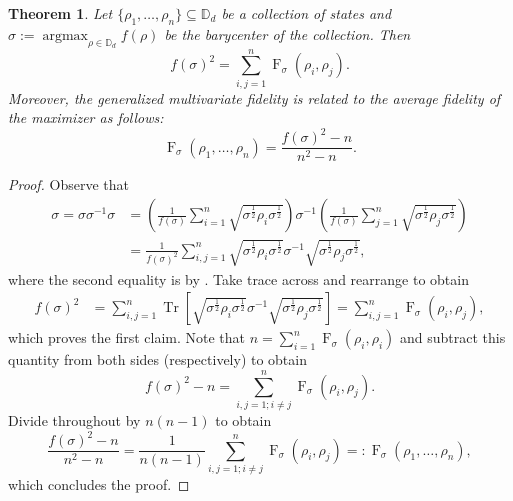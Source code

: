 \documentclass[12pt]{article}
\newtheorem{theorem}{Theorem}[section] %
\theoremstyle{definition}
\newcommand{\Fg}[3]{\operatorname{F}_{#3}\!\left(#1, #2\right)}
\DeclareMathOperator*{\argmax}{argmax}
\begin{document}
\begin{theorembox}
    \begin{theorem}
        Let $\{\rho_1, \dots, \rho_n\}  \subseteq \mathbb D_d$ be a collection of states and $\sigma := \argmax_{\rho \in \mathbb D_d} f(\rho)$ be the barycenter of the collection. Then
        \begin{equation}
            f(\sigma)^2 = \sum_{i,j=1}^{n} \Fg{\rho_i}{\rho_j}{\sigma}. 
        \end{equation}
        Moreover, the generalized multivariate fidelity is related to the average fidelity of the maximizer as follows:
        \begin{equation}
            \operatorname{F}_\sigma (\rho_1, \dots, \rho_n) = \frac{f(\sigma)^2-n}{n^2 - n}.
        \end{equation}
    \end{theorem}
\end{theorembox}
\begin{proof}
Observe that
\begin{equation}
    \begin{aligned}
              \sigma = \sigma \sigma ^{-1} \sigma  &= \left(\frac{1}{f(\sigma)} \sum_{i=1}^{n} \sqrt{\sigma ^{\frac12} \rho_i \sigma^{\frac12} }\right) \sigma^{-1} \left(\frac{1}{f(\sigma)} \sum_{j=1}^{n} \sqrt{\sigma ^{\frac12} \rho_j \sigma^{\frac12} } \right) \\
        &= \frac{1}{f(\sigma)^2} \sum_{i,j=1}^n \sqrt{\sigma ^{\frac12} \rho_i \sigma ^{\frac12}}  \sigma ^{-1} \sqrt{\sigma ^{\frac12} \rho_j \sigma ^{\frac12}},
    \end{aligned}
\end{equation}
where the second equality is by . Take trace across and rearrange to obtain
\begin{equation}
    \begin{aligned}
            f(\sigma)^2 &= \sum_{i,j=1}^{n} \operatorname{Tr}\left[ \sqrt{\sigma ^{\frac12} \rho_i \sigma ^{\frac12}}  \sigma ^{-1} \sqrt{\sigma ^{\frac12} \rho_j \sigma ^{\frac12}}\right] = \sum_{i,j=1}^{n} \Fg{\rho_i}{\rho_j}{\sigma}, 
    \end{aligned}
     \end{equation}
which proves the first claim. Note that $n = \sum_{i=1}^{n} \Fg{\rho_i}{\rho_i}{\sigma}$ and subtract this quantity from both sides (respectively) to obtain   
\begin{equation}
     f(\sigma)^2 - n = \sum_{i,j=1; i \neq j}^{n} \Fg{\rho_i}{\rho_j}{\sigma}. 
\end{equation}
Divide throughout by $n(n-1)$ to obtain
\begin{equation} 
    \frac{f(\sigma)^2 - n}{n^2 - n} = \frac1{n (n-1)} \sum_{i,j=1; i \neq j}^{n} \Fg{\rho_i}{\rho_j}{\sigma} =: \operatorname{F}_\sigma (\rho_1, \dots , \rho_n),
\end{equation}
which concludes the proof.
\end{proof}
\end{document}
